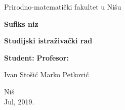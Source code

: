 \begin{titlepage}
\begin{center}
{\large Prirodno-matemati\v cki fakultet u Ni\v su}
\end{center}
\vspace{5cm}
\begin{center}
{\Huge \textbf{Sufiks niz}}
\end{center}
\begin{center}
{\large \textbf{Studijski istra\v ziva\v cki rad}}
\end{center}
\vspace{6cm}


\large \textbf{Student:} \hfill \textbf{Profesor:}

\large Ivan Sto\v si\' c \hfill Marko Petkovi\' c

\vspace{2.5cm}
\begin{center}{Ni\v s\\
Jul, 2019.}\end{center}
\end{titlepage}